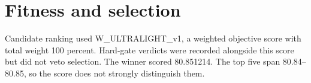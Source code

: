 \section{Fitness and selection}Candidate ranking used W\_ULTRALIGHT\_v1, a weighted objective score with total weight 100 percent. Hard-gate verdicts were recorded alongside this score but did not veto selection. The winner scored 80.851214. The top five span 80.84--80.85, so the score does not strongly distinguish them.
